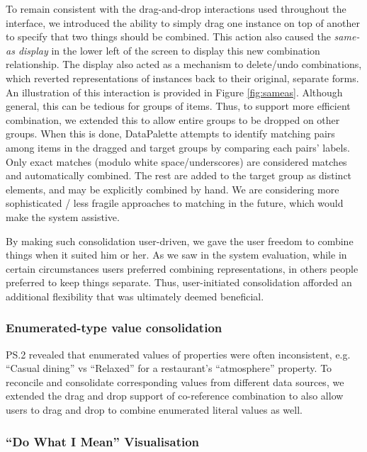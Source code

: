 \documentclass{sigchi}
\begin{document}
To remain consistent with the drag-and-drop interactions used throughout the interface, we introduced the ability to simply drag one instance on top of another to specify that two things should be combined.  This action also caused the \emph{same-as display} in the lower left of the screen to display this new combination relationship.  The display also acted as a mechanism to delete/undo combinations, which reverted representations of instances back to their original, separate forms. An illustration of this interaction is provided in Figure \ref{fig:sameas}. Although general, this can be tedious for groups of items.  Thus, to support more efficient combination, we extended this to allow entire groups to be dropped on other groups.  When this is done, DataPalette attempts to identify matching pairs among items in the dragged and target groups by comparing each pairs' labels.  Only exact matches (modulo white space/underscores) are considered matches and automatically combined.  The rest are added to the target group as distinct elements, and may be explicitly combined by hand.  We are considering more sophisticated / less fragile approaches to matching in the future, which would make the system assistive. 

By making such consolidation user-driven, we gave the user freedom to combine things when it suited him or her. As we saw in the system evaluation, while in certain circumstances users preferred combining representations, in others people preferred to keep things separate.  Thus, user-initiated consolidation afforded an additional flexibility that was ultimately deemed beneficial.

\subsubsection{Enumerated-type value consolidation}
PS.2 revealed that enumerated values of properties were often inconsistent, e.g. ``Casual dining'' vs ``Relaxed'' for a restaurant's ``atmosphere'' property. To reconcile and consolidate corresponding values from different  data sources, we extended the drag and drop support of co-reference combination to also allow users to drag and drop to combine enumerated literal values as well.  

\subsubsection{``Do What I Mean'' Visualisation}
\end{document}
